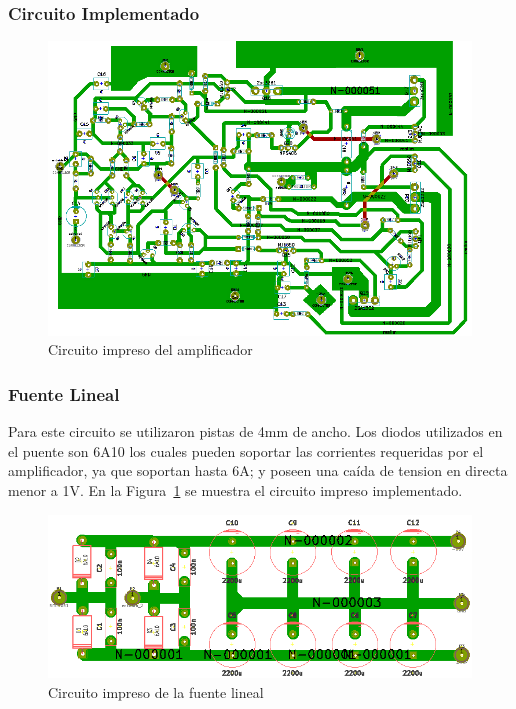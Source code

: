 \subsubsection{Circuito Implementado}
\begin{figure}[H]
\centerline{
\includegraphics[scale=0.55]{img/circuito_implementado_todo.png}}
\caption{Circuito impreso del amplificador}
\end{figure}

\subsubsection{Fuente Lineal}
\medskip
Para este circuito se utilizaron pistas de 4mm de ancho. Los diodos utilizados en el puente son 6A10 los cuales pueden soportar las corrientes requeridas por el amplificador, ya que soportan hasta 6A; y poseen una caída de tension en directa menor a 1V.
En la Figura~\ref{circuito_impreso_fuente_lineal} se muestra el circuito impreso implementado. 

\begin{figure}[H]
\centering
\centerline{\includegraphics[scale=0.53]{img/circuito_impreso_fuente_lineal.png}}
\caption{Circuito impreso de la fuente lineal}
\label{circuito_impreso_fuente_lineal} 
\end{figure}
